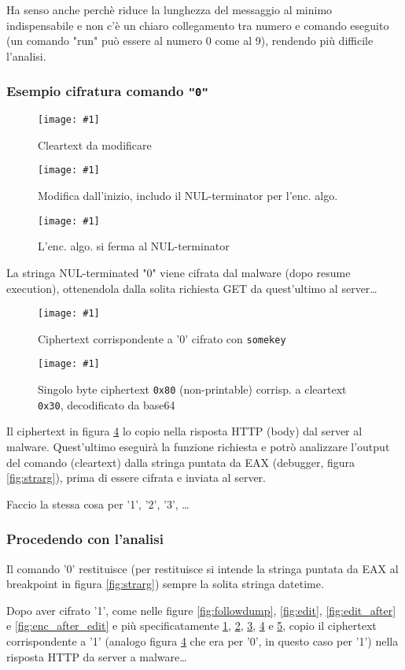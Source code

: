 \documentclass[
    a4paper, %
    11pt %
]{article}
\newcommand{\pic}[4]{\begin{figure}[H]
            \centering
            \texttt{[image: \#1]}
            \caption{#2}
            \label{fig:#1}
            \end{figure}}
\begin{document}
            Ha senso anche perchè riduce la lunghezza del messaggio al minimo indispensabile e non c'è un
            chiaro collegamento tra numero e comando eseguito (un comando "run" può essere al numero 0 come al
            9), rendendo più difficile l'analisi.
            
            \subsubsection*{Esempio cifratura comando \texttt{"0"}}

            \pic{ptexample}{Cleartext da modificare}{15cm}{2cm}
            \pic{ptchngexample}{Modifica dall'inizio, includo il NUL-terminator per l'enc. algo.}{15cm}{5cm}
            \pic{ptafterexample}{L'enc. algo. si ferma al NUL-terminator}{10cm}{2cm}
            La stringa NUL-terminated "0" viene cifrata dal malware (dopo resume execution), ottenendola dalla solita 
            richiesta GET da quest'ultimo al server\dots
            \pic{ctexample}{Ciphertext corrispondente a '0' cifrato con \texttt{somekey}}{13cm}{3cm}
            \pic{ctb64dexample}{Singolo byte ciphertext \texttt{0x80} (non-printable) corrisp. a cleartext \texttt{0x30}, decodificato da base64}{9cm}{2cm}

            Il ciphertext in figura \ref{fig:ctexample} lo copio nella risposta HTTP (body) dal server al malware. Quest'ultimo eseguirà la funzione richiesta e potrò analizzare l'output del comando (cleartext) dalla stringa
            puntata da EAX (debugger, figura \ref{fig:strarg}), prima di essere cifrata e inviata al server.

            Faccio la stessa cosa per '1', '2', '3', \dots

            \subsubsection*{Procedendo con l'analisi}
            
            Il comando '0' restituisce (per restituisce si intende la stringa puntata da EAX al breakpoint in figura \ref{fig:strarg}) sempre la solita stringa datetime.

            Dopo aver cifrato '1', come nelle figure \ref{fig:followdump}, \ref{fig:edit}, \ref{fig:edit_after} e
            \ref{fig:enc_after_edit} e più specificatamente \ref{fig:ptexample}, \ref{fig:ptchngexample},
            \ref{fig:ptafterexample}, \ref{fig:ctexample} e \ref{fig:ctb64dexample}, copio il 
            ciphertext corrispondente a '1' (analogo figura \ref{fig:ctexample} che era per '0', in questo caso 
            per '1') nella risposta HTTP da server a malware\dots
\end{document}
